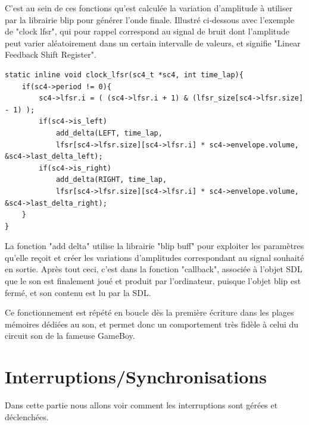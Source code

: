 \documentclass{report}
\begin{document}
C'est au sein de ces fonctions qu'est calculée la variation d'amplitude à utiliser par la librairie blip pour générer l'onde finale.
Illustré ci-dessous avec l'exemple de "clock lfsr", qui pour rappel correspond au signal de bruit dont l'amplitude peut varier aléatoirement dans 
un certain intervalle de valeurs, et signifie "Linear Feedback Shift Register".
\begin{lstlisting}
static inline void clock_lfsr(sc4_t *sc4, int time_lap){
	if(sc4->period != 0){
		sc4->lfsr.i = ( (sc4->lfsr.i + 1) & (lfsr_size[sc4->lfsr.size] - 1) );
		if(sc4->is_left)
			add_delta(LEFT, time_lap,
			lfsr[sc4->lfsr.size][sc4->lfsr.i] * sc4->envelope.volume, &sc4->last_delta_left);
		if(sc4->is_right)
			add_delta(RIGHT, time_lap,
			lfsr[sc4->lfsr.size][sc4->lfsr.i] * sc4->envelope.volume, &sc4->last_delta_right);
	}
}
\end{lstlisting}

La fonction "add delta" utilise la librairie "blip buff" pour exploiter les paramètres qu'elle reçoit et créer 
les variations d'amplitudes correspondant au signal souhaité en sortie.
Après tout ceci, c'est dans la fonction "callback", associée à l'objet SDL que le son est finalement joué et produit par l'ordinateur, puisque l'objet blip est fermé, et son contenu est lu par la SDL.

Ce fonctionnement est répété en boucle dès la première écriture dans les plages mémoires dédiées au son, et permet donc un comportement très fidèle à celui du circuit son de la fameuse GameBoy.
\section{Interruptions/Synchronisations}
Dans cette partie nous allons voir comment les interruptions sont gérées et déclenchées. 
\end{document}
